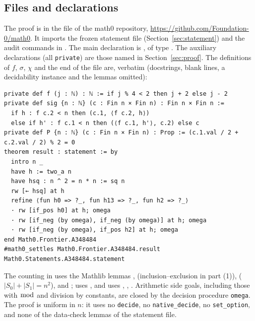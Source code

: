 \documentclass[11pt]{amsart}
\theoremstyle{plain}
\theoremstyle{definition}
\begin{document}
\subsection*{Files and declarations}
The proof is in the file  of the math0 repository, \url{https://github.com/Foundation-0/math0}. It imports the frozen statement file  (Section~\ref{sec:statement}) and the audit commands in . The main declaration is , of type . The auxiliary declarations (all \texttt{private}) are those named in Section~\ref{sec:proof}. The definitions of $f$, $\sigma$, $\chi$ and the end of the file are, verbatim (docstrings, blank lines, a decidability instance and the lemmas omitted):
\begin{lstlisting}
private def f (j : ℕ) : ℕ := if j % 4 < 2 then j + 2 else j - 2
private def sig {n : ℕ} (c : Fin n × Fin n) : Fin n × Fin n :=
  if h : f c.2 < n then (c.1, ⟨f c.2, h⟩)
  else if h' : f c.1 < n then (⟨f c.1, h'⟩, c.2) else c
private def P {n : ℕ} (c : Fin n × Fin n) : Prop := (c.1.val / 2 + c.2.val / 2) % 2 = 0
theorem result : statement := by
  intro n _
  have h := two_a n
  have hsq : n ^ 2 = n * n := sq n
  rw [← hsq] at h
  refine ⟨fun h0 => ?_, fun h13 => ?_, fun h2 => ?_⟩
  · rw [if_pos h0] at h; omega
  · rw [if_neg (by omega), if_neg (by omega)] at h; omega
  · rw [if_neg (by omega), if_pos h2] at h; omega
end Math0.Frontier.A348484
#math0_settles Math0.Frontier.A348484.result Math0.Statements.A348484.statement
\end{lstlisting}
The counting in  uses the Mathlib lemmas ,  (inclusion--exclusion in part (1)),  ($|S_0|+|S_1|=n^2$),  and ;  uses , and  uses , , . Arithmetic side goals, including those with $\bmod$ and division by constants, are closed by the decision procedure \texttt{omega}.
The proof is uniform in $n$: it uses no \texttt{decide}, no \texttt{native\_decide}, no \texttt{set\_option}, and none of the data-check lemmas of the statement file.
\end{document}
